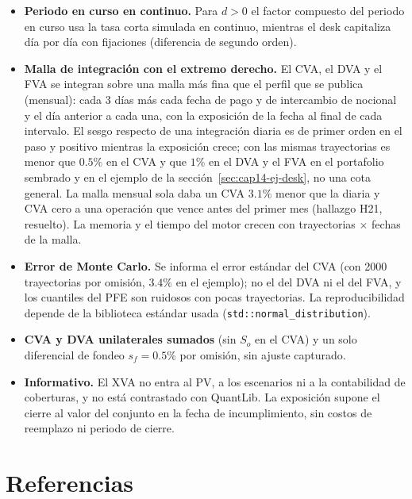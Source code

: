 \begin{limites}
\begin{itemize}
          cada operación; sin KVA ni MVA.
    \item \textbf{Periodo en curso en continuo.} Para $d>0$ el factor compuesto del periodo en curso usa la tasa corta simulada en
          continuo, mientras el desk capitaliza día por día con fijaciones (diferencia de segundo orden).
    \item \textbf{Malla de integración con el extremo derecho.} El CVA, el DVA y el FVA se integran sobre una malla más fina que
          el perfil que se publica (mensual): cada 3 días más cada fecha de pago y de intercambio de nocional y el día anterior
          a cada una, con la exposición de la fecha al final de cada intervalo. El sesgo respecto de una integración diaria es de
          primer orden en el paso y positivo mientras la exposición crece; con las mismas trayectorias es menor que $0.5\%$ en el
          CVA y que $1\%$ en el DVA y el FVA en el portafolio sembrado y en el ejemplo de la
          sección~\ref{sec:cap14-ej-desk}, no una cota general. La malla mensual sola daba un CVA $3.1\%$ menor que la diaria y
          CVA cero a una operación que vence antes del primer mes (hallazgo H21, resuelto). La memoria y el tiempo del motor
          crecen con trayectorias $\times$ fechas de la malla.
    \item \textbf{Error de Monte Carlo.} Se informa el error estándar del CVA (con 2000 trayectorias por omisión, $3.4\%$ en el ejemplo);
          no el del DVA ni el del FVA, y los cuantiles del PFE son ruidosos con pocas trayectorias. La reproducibilidad depende de
          la biblioteca estándar usada (\texttt{std::normal\_distribution}).
    \item \textbf{CVA y DVA unilaterales sumados} (sin $S_o$ en el CVA) y un solo diferencial de fondeo $s_f=0.5\%$ por omisión, sin
          ajuste capturado.
    \item \textbf{Informativo.} El XVA no entra al PV, a los escenarios ni a la contabilidad de coberturas, y no está contrastado con QuantLib.
          La exposición supone el cierre al valor del conjunto en la fecha de incumplimiento, sin costos de reemplazo ni
          periodo de cierre.
  \end{itemize}
\end{limites}

\section{Referencias}\label{sec:cap14-referencias}

